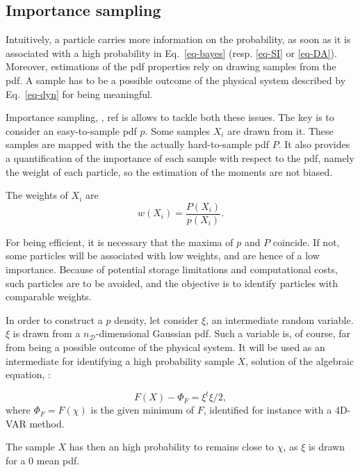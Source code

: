 \documentclass[10pt,openany,onecolumn,a4wide,pof]{article}
\newcommand{\todo}[1]{{\color{red} #1 }}
\newcommand{\mypar}[1]{\left(#1\right)}
\newcommand{\Nphaz}{n_{\mathcal{D}}} %
\newcommand{\rpoint}{X}
\begin{document}
\subsection{Importance sampling}

Intuitively, a particle carries more information on the probability, as soon as it is associated with a high probability in Eq.~\eqref{eq-bayes} (resp. \eqref{eq-SI} or \eqref{eq-DA}).
Moreover, estimations of the pdf properties rely on drawing samples from the pdf. 
A sample has to be a possible outcome of the physical system described by Eq.~\eqref{eq-dyn} for being meaningful.

Importance sampling, \cite{Chorin2010,Morzfeld2012}, \todo{ref is} allows to tackle both these issues.
The key is to consider an easy-to-sample pdf $p$. Some samples $\rpoint_i$ are drawn from it. These samples are mapped with the the actually hard-to-sample pdf $P$.
It also provides a quantification of the importance of each sample with respect to the pdf, namely the weight of each particle, so the estimation of the moments are not biased.

The weights of $\rpoint_i$ are
\begin{equation}
w\mypar{\rpoint_i} = \frac{P\mypar{\rpoint_i}}{p\mypar{\rpoint_i}}.
\label{eq-weight}
\end{equation}

For being efficient, it is necessary that the maxima of $p$ and $P$ coincide. If not, some particles will be associated with low weights, and are hence of a low importance. Because of potential storage limitations and computational costs, such particles are to be avoided, and the objective is to identify particles with comparable weights.


In order to construct a $p$ density, let consider $\xi$, an intermediate
random variable. $\xi$ is drawn from a $\Nphaz$-dimensional Gaussian pdf.
Such a variable is, of course, far from being a possible outcome of the
physical system. It will be used as an intermediate for identifying a high
probability sample $\rpoint$, solution of the algebraic equation,
\cite{Morzfeld2012}:

\begin{equation}
F\mypar{\rpoint} - \Phi_F = \xi^t\xi/2,
\label{eq-alg}
\end{equation}
where $\Phi_F = F\mypar{\chi}$ is the given minimum of $F$, identified for instance with a 4D-VAR method.

The sample $X$ has then an high probability to remains close to $\chi$, as $\xi$ is drawn for a $0$ mean pdf. 
\end{document}
